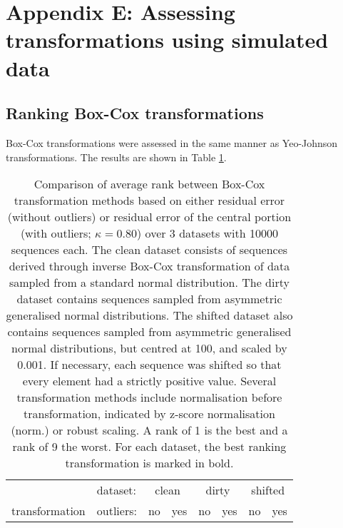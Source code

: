 \documentclass[
  a4paper,
]{article}
\begin{document}
\section{Appendix E: Assessing transformations using simulated
data}\label{appendix-e-assessing-transformations-using-simulated-data}

\subsection{Ranking Box-Cox
transformations}\label{ranking-box-cox-transformations}

Box-Cox transformations were assessed in the same manner as Yeo-Johnson
transformations. The results are shown in Table
\ref{tab:comparison_methods_simulations_box_cox}.

\begin{table}
\begin{center}
\caption{
Comparison of average rank between Box-Cox transformation methods based on either residual error (without outliers) or residual error of the central portion
(with outliers; $\kappa = 0.80$) over 3 datasets with 10000 sequences each. The clean dataset consists of sequences derived through inverse Box-Cox transformation
of data sampled from a standard normal distribution. The dirty dataset contains sequences sampled from asymmetric generalised normal distributions.
The shifted dataset also contains sequences sampled from asymmetric generalised normal distributions, but centred at 100, and scaled by 0.001.
If necessary, each sequence was shifted so that every element had a strictly positive value. 
Several transformation methods include normalisation before transformation, indicated by z-score normalisation (norm.) or robust scaling.
A rank of 1 is the best and a rank of 9 the worst. For each dataset, the best ranking transformation is marked in bold.
}
\label{tab:comparison_methods_simulations_box_cox}
\begin{tabular}{l | l r r r r r r}

\toprule
& dataset: & \multicolumn{2}{c}{clean} & \multicolumn{2}{c}{dirty} & \multicolumn{2}{c}{shifted} \\
transformation & outliers: & no & yes & no & yes & no & yes \\

\midrule


\end{tabular}
\end{center}
\end{table}
\end{document}
